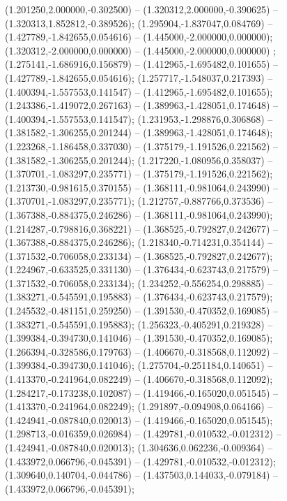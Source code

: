  (1.201250,2.000000,-0.302500) -- (1.320312,2.000000,-0.390625) -- (1.320313,1.852812,-0.389526);
 (1.295904,-1.837047,0.084769) -- (1.427789,-1.842655,0.054616) -- (1.445000,-2.000000,0.000000);
 (1.320312,-2.000000,0.000000) -- (1.445000,-2.000000,0.000000) ;
 (1.275141,-1.686916,0.156879) -- (1.412965,-1.695482,0.101655) -- (1.427789,-1.842655,0.054616);
 (1.257717,-1.548037,0.217393) -- (1.400394,-1.557553,0.141547) -- (1.412965,-1.695482,0.101655);
 (1.243386,-1.419072,0.267163) -- (1.389963,-1.428051,0.174648) -- (1.400394,-1.557553,0.141547);
 (1.231953,-1.298876,0.306868) -- (1.381582,-1.306255,0.201244) -- (1.389963,-1.428051,0.174648);
 (1.223268,-1.186458,0.337030) -- (1.375179,-1.191526,0.221562) -- (1.381582,-1.306255,0.201244);
 (1.217220,-1.080956,0.358037) -- (1.370701,-1.083297,0.235771) -- (1.375179,-1.191526,0.221562);
 (1.213730,-0.981615,0.370155) -- (1.368111,-0.981064,0.243990) -- (1.370701,-1.083297,0.235771);
 (1.212757,-0.887766,0.373536) -- (1.367388,-0.884375,0.246286) -- (1.368111,-0.981064,0.243990);
 (1.214287,-0.798816,0.368221) -- (1.368525,-0.792827,0.242677) -- (1.367388,-0.884375,0.246286);
 (1.218340,-0.714231,0.354144) -- (1.371532,-0.706058,0.233134) -- (1.368525,-0.792827,0.242677);
 (1.224967,-0.633525,0.331130) -- (1.376434,-0.623743,0.217579) -- (1.371532,-0.706058,0.233134);
 (1.234252,-0.556254,0.298885) -- (1.383271,-0.545591,0.195883) -- (1.376434,-0.623743,0.217579);
 (1.245532,-0.481151,0.259250) -- (1.391530,-0.470352,0.169085) -- (1.383271,-0.545591,0.195883);
 (1.256323,-0.405291,0.219328) -- (1.399384,-0.394730,0.141046) -- (1.391530,-0.470352,0.169085);
 (1.266394,-0.328586,0.179763) -- (1.406670,-0.318568,0.112092) -- (1.399384,-0.394730,0.141046);
 (1.275704,-0.251184,0.140651) -- (1.413370,-0.241964,0.082249) -- (1.406670,-0.318568,0.112092);
 (1.284217,-0.173238,0.102087) -- (1.419466,-0.165020,0.051545) -- (1.413370,-0.241964,0.082249);
 (1.291897,-0.094908,0.064166) -- (1.424941,-0.087840,0.020013) -- (1.419466,-0.165020,0.051545);
 (1.298713,-0.016359,0.026984) -- (1.429781,-0.010532,-0.012312) -- (1.424941,-0.087840,0.020013);
 (1.304636,0.062236,-0.009364) -- (1.433972,0.066796,-0.045391) -- (1.429781,-0.010532,-0.012312);
 (1.309640,0.140704,-0.044786) -- (1.437503,0.144033,-0.079184) -- (1.433972,0.066796,-0.045391);
